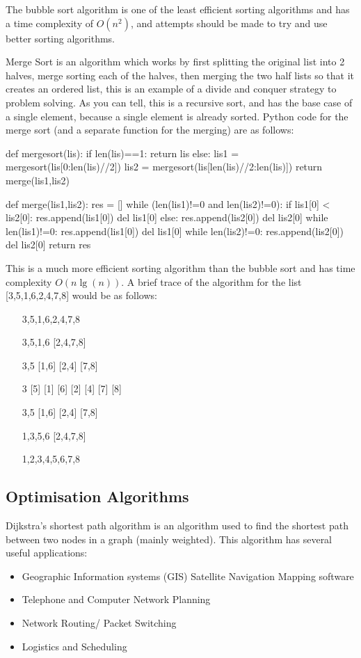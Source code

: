 The bubble sort algorithm is one of the least efficient sorting algorithms and has a time complexity of $O(n^2)$, and attempts should be made to try and use better sorting algorithms.

  \noindent
  Merge Sort is an algorithm which works by first splitting the original list into 2 halves, merge sorting each of the halves, then merging the two half lists so that it creates an ordered list, this is an example of a divide and conquer strategy to problem solving. As you can tell, this is a recursive sort, and has the base case of a single element, because a single element is already sorted. Python code for the merge sort (and a separate function for the merging) are as follows:

\begin{python}
def mergesort(lis):
	if len(lis)==1:
		return lis
	else:
		lis1 = mergesort(lis[0:len(lis)//2])
		lis2 = mergesort(lis[len(lis)//2:len(lis)])
		return merge(lis1,lis2)

def merge(lis1,lis2):
	res = []
	while (len(lis1)!=0 and len(lis2)!=0):
		if lis1[0] < lis2[0]:
			res.append(lis1[0])
			del lis1[0]
		else:
			res.append(lis2[0])
			del lis2[0]
	while len(lis1)!=0:
		res.append(lis1[0])
		del lis1[0]
	while len(lis2)!=0:
		res.append(lis2[0])
		del lis2[0]
	return res
\end{python}

This is a much more efficient sorting algorithm than the bubble sort and has time complexity $O(n\lg(n))$. A brief trace of the algorithm for the list [3,5,1,6,2,4,7,8] would be as follows:

\begin{enumerate}
	\item [3,5,1,6,2,4,7,8]
	\item [3,5,1,6] [2,4,7,8]
	\item [3,5] [1,6] [2,4] [7,8]
	\item [3] [5] [1] [6] [2] [4] [7] [8]
	\item [3,5] [1,6] [2,4] [7,8]
	\item [1,3,5,6] [2,4,7,8]
	\item [1,2,3,4,5,6,7,8]
\end{enumerate}

\subsection{Optimisation Algorithms}
  \noindent
  Dijkstra's shortest path algorithm is an algorithm used to find the shortest path between two nodes in a graph (mainly weighted). This algorithm has several useful applications:
  \begin{itemize}
  	\item Geographic Information systems (GIS)
	  	\subitem Satellite Navigation
	  	\subitem Mapping software
	\item Telephone and Computer Network Planning
	\item Network Routing/ Packet Switching
	\item Logistics and Scheduling
  \end{itemize}
  
